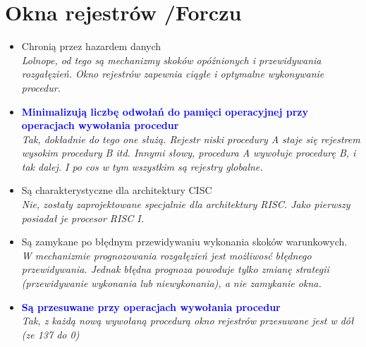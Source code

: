 \documentclass[a4paper,twoside]{article}
\begin{document}
\section{Okna rejestrów {\small /Forczu}}
	\begin{itemize}
    \item Chronią przez hazardem danych\\
    {\small \emph{Lolnope, od tego są mechanizmy skoków opóźnionych i przewidywania rozgałęzień. Okno rejestrów zapewnia ciągłe i optymalne wykonywanie procedur.}}
    \item \textcolor{Blue}{\textbf{Minimalizują liczbę odwołań do pamięci operacyjnej przy operacjach wywołania procedur}}\\
    {\small \emph{Tak, dokładnie do tego one służą. Rejestr niski procedury A staje się rejestrem wysokim procedury B itd. Innymi słowy, procedura A wywołuje procedurę B, i tak dalej. I po cos w tym wszystkim są rejestry globalne.}}
    \item Są charakterystyczne dla architektury CISC\\
    {\small \emph{Nie, zostały zaprojektowane specjalnie dla architektury RISC. Jako pierwszy posiadał je procesor RISC I.}}
    \item Są zamykane po błędnym przewidywaniu wykonania skoków warunkowych.\\
    {\small \emph{W mechanizmie prognozowania rozgałęzień jest możliwosć błędnego przewidywania. Jednak błędna prognoza powoduje tylko zmianę strategii (przewidywanie wykonania lub niewykonania), a nie zamykanie okna.}}
    \item \textcolor{Blue}{\textbf{Są przesuwane przy operacjach wywołania procedur}}\\
    {\small \emph{Tak, z każdą nową wywołaną procedurą okno rejestrów przesuwane jest w dół (ze 137 do 0)}}
    \end{itemize}
\end{document}
